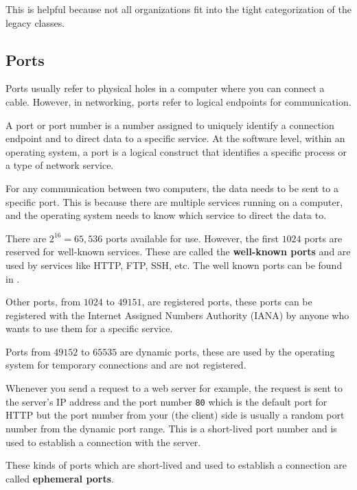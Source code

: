 This is helpful because not all organizations fit
into the tight categorization of the legacy classes.

\subsection{Ports}

Ports usually refer to physical holes in a computer
where you can connect a cable. However, in networking,
ports refer to logical endpoints for communication.

\begin{definition}[Port]
A port or port number is a number assigned to uniquely identify
a connection endpoint and to direct data to a specific service.
At the software level, within an operating system, a port is a
logical construct that identifies a specific process or a type
of network service.
\end{definition}

For any communication between two computers, the data
needs to be sent to a specific port. This is because
there are multiple services running on a computer, and
the operating system needs to know which service to
direct the data to.

There are $2^{16} = 65,536$ ports available for use.
However, the first $1024$ ports are reserved for
well-known services. These are called the \textbf{well-known
ports} and are used by services like HTTP, FTP, SSH, etc.
The well known ports can be found in .

Other ports, from $1024$ to $49151$, are registered ports,
these ports can be registered with the Internet Assigned
Numbers Authority (IANA) by anyone who wants to use them
for a specific service.

Ports from $49152$ to $65535$ are dynamic ports, these
are used by the operating system for temporary connections
and are not registered.

Whenever you send a request to a web server for example,
the request is sent to the server's IP address and the
port number \texttt{80} which is the default port for
HTTP
but the port number from your (the client) side is
usually a random port number from the dynamic port range.
This is a short-lived port number and is used to
establish a connection with the server.

These kinds of ports which are short-lived and used
to establish a connection are called \textbf{ephemeral ports}.

